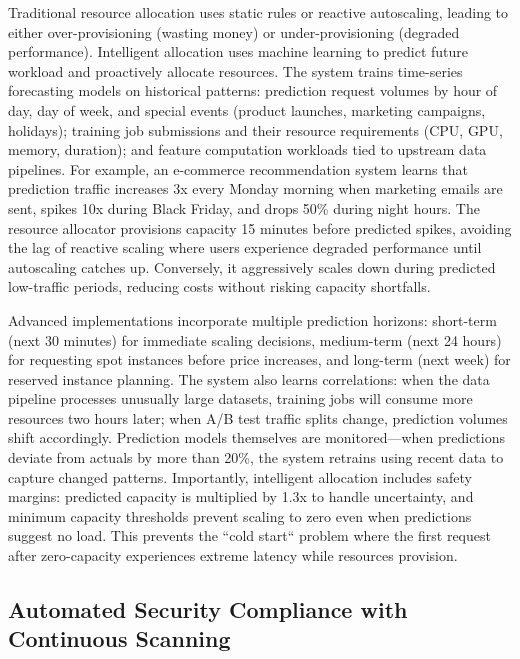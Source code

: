 Traditional resource allocation uses static rules or reactive autoscaling, leading to either over-provisioning (wasting money) or under-provisioning (degraded performance). Intelligent allocation uses machine learning to predict future workload and proactively allocate resources. The system trains time-series forecasting models on historical patterns: prediction request volumes by hour of day, day of week, and special events (product launches, marketing campaigns, holidays); training job submissions and their resource requirements (CPU, GPU, memory, duration); and feature computation workloads tied to upstream data pipelines. For example, an e-commerce recommendation system learns that prediction traffic increases 3x every Monday morning when marketing emails are sent, spikes 10x during Black Friday, and drops 50\% during night hours. The resource allocator provisions capacity 15 minutes before predicted spikes, avoiding the lag of reactive scaling where users experience degraded performance until autoscaling catches up. Conversely, it aggressively scales down during predicted low-traffic periods, reducing costs without risking capacity shortfalls.

Advanced implementations incorporate multiple prediction horizons: short-term (next 30 minutes) for immediate scaling decisions, medium-term (next 24 hours) for requesting spot instances before price increases, and long-term (next week) for reserved instance planning. The system also learns correlations: when the data pipeline processes unusually large datasets, training jobs will consume more resources two hours later; when A/B test traffic splits change, prediction volumes shift accordingly. Prediction models themselves are monitored---when predictions deviate from actuals by more than 20\%, the system retrains using recent data to capture changed patterns. Importantly, intelligent allocation includes safety margins: predicted capacity is multiplied by 1.3x to handle uncertainty, and minimum capacity thresholds prevent scaling to zero even when predictions suggest no load. This prevents the ``cold start`` problem where the first request after zero-capacity experiences extreme latency while resources provision.

\subsection{Automated Security Compliance with Continuous Scanning}

